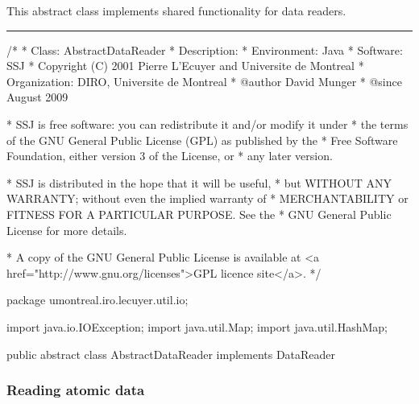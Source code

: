 
This abstract class implements shared functionality for data readers.

\bigskip\hrule

\begin{code}\begin{hide}
/*
 * Class:        AbstractDataReader
 * Description:  
 * Environment:  Java
 * Software:     SSJ 
 * Copyright (C) 2001  Pierre L'Ecuyer and Universite de Montreal
 * Organization: DIRO, Universite de Montreal
 * @author       David Munger 
 * @since        August 2009

 * SSJ is free software: you can redistribute it and/or modify it under
 * the terms of the GNU General Public License (GPL) as published by the
 * Free Software Foundation, either version 3 of the License, or
 * any later version.

 * SSJ is distributed in the hope that it will be useful,
 * but WITHOUT ANY WARRANTY; without even the implied warranty of
 * MERCHANTABILITY or FITNESS FOR A PARTICULAR PURPOSE.  See the
 * GNU General Public License for more details.

 * A copy of the GNU General Public License is available at
   <a href="http://www.gnu.org/licenses">GPL licence site</a>.
 */
\end{hide}
package umontreal.iro.lecuyer.util.io;
\begin{hide}
import java.io.IOException;
import java.util.Map;
import java.util.HashMap;
\end{hide}

public abstract class AbstractDataReader implements DataReader \begin{hide} {
\end{hide}
\end{code}

\subsubsection*{Reading atomic data}

